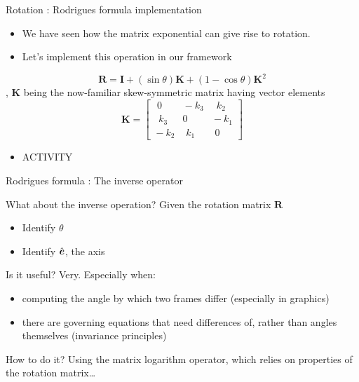 \documentclass[notes]{beamer}
\newcommand{\gv}[1]{\ensuremath{\mbox{\boldmath$ #1 $}}}
\newcommand{\bv}[1]{\ensuremath{\mathbf{#1}}}
\begin{document}
\begin{frame}[label={sec:org5df1d35}]{Rotation : Rodrigues formula implementation}
\begin{itemize}
\item We have seen how the matrix exponential can give rise to rotation.
\item Let's implement this operation in our framework
\end{itemize}
\[ \mathbf {R} =\mathbf {I} +(\sin \theta )\mathbf {K} +(1-\cos \theta )\mathbf {K} ^{2} \]
, \(\bv{K}\) being the now-familiar skew-symmetric matrix having vector elements
\[ \mathbf {K} = \begin{bmatrix}\,\,0&\!-k_{3}&\,\,\,k_{2}\\\,\,\,k_{3}&0&\!-k_{1}\\\!-k_{2}&\,\,k_{1}&\,\,0\end{bmatrix}
   \]
\begin{itemize}
\item \alert{ACTIVITY}
\end{itemize}
\end{frame}
\begin{frame}[label={sec:org918ddfe}]{Rodrigues formula : The inverse operator}
\begin{block}{What about the inverse operation?}
Given the rotation matrix \(\bv{R}\)
\begin{itemize}
\item Identify \(\theta\)
\item Identify \(\hat{\gv{e}}\), the axis
\end{itemize}
\end{block}
\begin{block}{Is it useful?}
Very. Especially when:
\begin{itemize}
\item computing the angle by which two frames differ (especially in graphics)
\item there are governing equations that need differences of, rather than
angles themselves (invariance principles)
\end{itemize}
\end{block}
\begin{block}{How to do it?}
Using the matrix logarithm operator, which relies on properties of the
rotation matrix\ldots{}
\end{block}
\end{frame}
\end{document}
